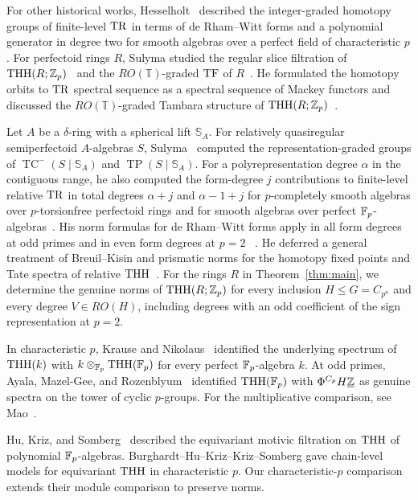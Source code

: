 For other historical works,
Hesselholt~\cite[Theorem~B]{HesCurves} described the integer-graded
homotopy groups of finite-level $\operatorname{TR}$ in terms of de Rham--Witt forms
and a polynomial generator in degree two for smooth algebras over a perfect field of characteristic $p$.
For perfectoid rings $R$, Sulyma studied the regular slice filtration
of $\operatorname{THH}(R;\mathbb Z_p)$~\cite{SulymaSlice} and the $RO(\mathbb T)$-graded
$\operatorname{TF}$ of $R$~\cite{SulymaTF}. He formulated the homotopy orbits to
$\operatorname{TR}$ spectral sequence as a spectral sequence of Mackey functors
and discussed the $RO(\mathbb T)$-graded Tambara structure of
$\operatorname{THH}(R;\mathbb Z_p)$~\cite[Sections~1 and~3.2]{SulymaTF}.

Let $A$ be a $\delta$-ring with a spherical lift $\mathbb S_A$.
For relatively quasiregular semiperfectoid $A$-algebras $S$,
Sulyma~\cite[Theorem~1.9]{SulymaNew} computed the representation-graded
groups of $\operatorname{TC}^-(S\mid\mathbb S_A)$ and
$\operatorname{TP}(S\mid\mathbb S_A)$.
For a polyrepresentation degree $\alpha$ in the contiguous range, he also computed
the form-degree $j$ contributions to finite-level relative $\operatorname{TR}$ in total degrees
$\alpha+j$ and $\alpha-1+j$ for $p$-completely
smooth algebras over $p$-torsionfree perfectoid rings and for smooth
algebras over perfect $\mathbb F_p$-algebras~\cite[Theorem~4.12]{SulymaNew}.
His norm formulas for de Rham--Witt forms apply in all form degrees
at odd primes and in even form degrees at $p=2$%
~\cite[Remark~1.20 and Theorem~5.7]{SulymaNew}.
He deferred a general treatment of Breuil--Kisin and prismatic norms
for the homotopy fixed points and Tate spectra of relative
$\operatorname{THH}$~\cite[Section~1.3.3]{SulymaNew}.
For the rings $R$ in Theorem~\ref{thm:main}, we determine the genuine
norms of $\operatorname{THH}(R;\mathbb Z_p)$ for every inclusion $H\le G=C_{p^n}$ and
every degree $V\in RO(H)$, including degrees with an odd coefficient
of the sign representation at $p=2$.

In characteristic $p$, Krause and Nikolaus~\cite[Proposition~2.1]{KrauseNikolaus}
identified the underlying spectrum of $\operatorname{THH}(k)$ with
$k\otimes_{\mathbb F_p}\operatorname{THH}(\mathbb F_p)$ for every perfect $\mathbb F_p$-algebra $k$.
At odd primes, Ayala, Mazel-Gee, and Rozenblyum~\cite[Corollary~10.8]{AMRDerived}
identified $\operatorname{THH}(\mathbb F_p)$ with $\Phi^{C_p}H\underline{\mathbb Z}$ as genuine spectra on
the tower of cyclic $p$-groups. For the multiplicative comparison, see
Mao~\cite[Remark~7.6]{MaoDecomplete}.

Hu, Kriz, and Somberg~\cite[Theorem~2]{HKSMotivic} described the
equivariant motivic filtration on $\operatorname{THH}$ of polynomial $\mathbb F_p$-algebras.
Burghardt--Hu--Kriz--Kriz--Somberg \cite{Kriz}
gave chain-level models for equivariant $\operatorname{THH}$
in characteristic $p$.
Our characteristic-$p$ comparison extends their
module comparison to preserve norms.

